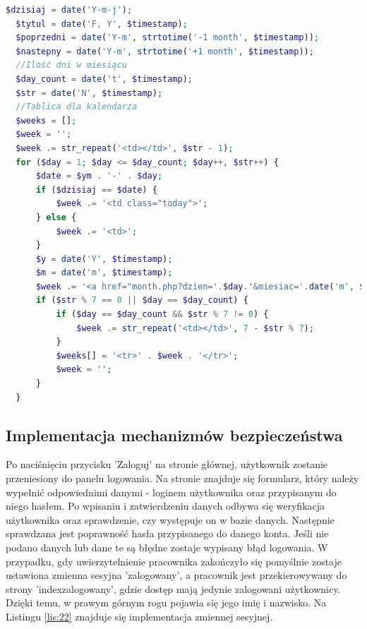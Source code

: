 \documentclass[eng,printmode,openany,oneside]{mgr}
\begin{document}
	\newpage
	
\begin{lstlisting}[caption={Implementacja przesuwania miesiąca}, language=PHP, label={lis:21}]
  $dzisiaj = date('Y-m-j');
  $tytul = date('F, Y', $timestamp);
  $poprzedni = date('Y-m', strtotime('-1 month', $timestamp));
  $nastepny = date('Y-m', strtotime('+1 month', $timestamp));
  //Ilość dni w miesiącu
  $day_count = date('t', $timestamp);
  $str = date('N', $timestamp);
  //Tablica dla kalendarza
  $weeks = [];
  $week = '';
  $week .= str_repeat('<td></td>', $str - 1);
  for ($day = 1; $day <= $day_count; $day++, $str++) {
      $date = $ym . '-' . $day;
      if ($dzisiaj == $date) {
          $week .= '<td class="today">';
      } else {
          $week .= '<td>';
      }
      $y = date('Y', $timestamp);
      $m = date('m', $timestamp);
      $week .= '<a href="month.php?dzien='.$day.'&miesiac='.date('m', $timestamp).'&rok='.date('Y', $timestamp).'&yes=1">' . $day . '</a></td>';
      if ($str % 7 == 0 || $day == $day_count) {
          if ($day == $day_count && $str % 7 != 0) {
              $week .= str_repeat('<td></td>', 7 - $str % 7);
          }
          $weeks[] = '<tr>' . $week . '</tr>';
          $week = '';
      }
  }
\end{lstlisting}

	
		
	

\subsection{Implementacja mechanizmów bezpieczeństwa}

Po naciśnięciu przycisku 'Zaloguj' na stronie głównej, użytkownik zostanie przeniesiony do panelu logowania. Na stronie znajduje się formularz, który należy wypełnić odpowiednimi danymi - loginem użytkownika oraz przypisanym do niego hasłem. Po wpisaniu i zatwierdzeniu danych odbywa się weryfikacja użytkownika oraz sprawdzenie, czy występuje on w bazie danych. Następnie sprawdzana jest poprawność hasła przypisanego do danego konta. Jeśli nie podano danych lub dane te są błędne zostaje wypisany błąd logowania. W przypadku, gdy uwierzytelnienie pracownika zakończyło się pomyślnie zostaje ustawiona zmienna sesyjna 'zalogowany', a pracownik jest przekierowywany do strony 'indexzalogowany', gdzie dostęp mają jedynie zalogowani użytkownicy. Dzięki temu, w prawym górnym rogu pojawia się jego imię i nazwisko. Na Listingu \ref{lis:22} znajduje się implementacja zmiennej sesyjnej.
\end{document}
